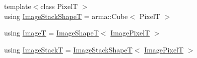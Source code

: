 \begin{DoxyCompactItemize}
{\footnotesize template$<$class PixelT $>$ }\\using \hyperlink{classmappel_1_1ImageFormat2DBase_ae2e123c8a5a5ab00f89eaea04d2431cb}{Image\+Stack\+ShapeT} = arma\+::\+Cube$<$ PixelT $>$
\item 
using \hyperlink{classmappel_1_1ImageFormat2DBase_a667ea5016648958e507e7db8eaa041b0}{ImageT} = \hyperlink{classmappel_1_1ImageFormat2DBase_ac40fc3773b5668601c63905876cca732}{Image\+ShapeT}$<$ \hyperlink{classmappel_1_1ImageFormat2DBase_af6bae6f78398ab1eacb39726a05adeef}{Image\+PixelT} $>$
\item 
using \hyperlink{classmappel_1_1ImageFormat2DBase_a8f0276e94ff242fa4740a718642f5e14}{Image\+StackT} = \hyperlink{classmappel_1_1ImageFormat2DBase_ae2e123c8a5a5ab00f89eaea04d2431cb}{Image\+Stack\+ShapeT}$<$ \hyperlink{classmappel_1_1ImageFormat2DBase_af6bae6f78398ab1eacb39726a05adeef}{Image\+PixelT} $>$
\end{DoxyCompactItemize}

